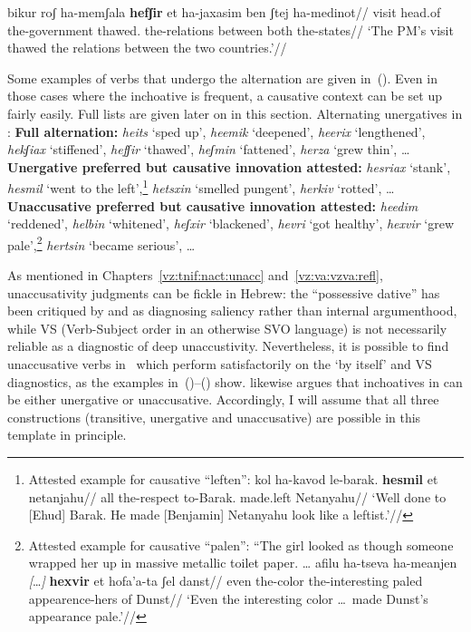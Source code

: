 	\a \begingl
		\gla bikur roʃ ha-memʃala \textbf{hefʃir} et ha-jaxasim ben ʃtej ha-medinot//
		\glb visit head.of the-government thawed.  the-relations between both the-states//
		\glft `The PM's visit thawed the relations between the two countries.'//
		\endgl
\xe

Some examples of verbs that undergo the alternation are given in~(\nextx). Even in those cases where the inchoative is frequent, a causative context can be set up fairly easily. Full lists are given later on in this section.
\pex\label{ex:vd:thif-alt}Alternating unergatives in \thif:
	\a \textbf{Full alternation:} \emph{hei{ts}} `sped up', \emph{heemik} `deepened', \emph{heerix} `lengthened', \emph{hekʃiax} `stiffened', \emph{hefʃir} `thawed', \emph{heʃmin} `fattened', \emph{herza} `grew thin', \dots
	\a \textbf{Unergative preferred but causative innovation attested:} \emph{hesriax} `stank', \emph{hesmil} `went to the left',\footnote{Attested example for causative ``leften'':
	\ex
		\begingl
		\gla kol ha-kavod le-barak. \textbf{hesmil} et netanjahu//
		\glb all the-respect to-Barak. made.left  Netanyahu//
		\glft `Well done to [Ehud] Barak. He made [Benjamin] Netanyahu look like a leftist.'//
		\endgl
	\xe
	} \emph{he{ts}xin} `smelled pungent', \emph{herkiv} `rotted', \dots
	\a \textbf{Unaccusative preferred but causative innovation attested:} \emph{heedim} `reddened', \emph{helbin} `whitened', \emph{heʃxir} `blackened', \emph{hevri} `got healthy',
		\emph{hexvir} `grew pale',\footnote{Attested example for causative ``palen'':
		\ex ``The girl looked as though someone wrapped her up in massive metallic toilet paper. \dots
			\begingl
			\gla afilu ha-tseva ha-meanjen \emph{[}\dots\emph{]} \textbf{hexvir} et hofa'a-ta ʃel danst//
			\glb even the-color the-interesting {} paled  appearence-hers of Dunst//
			\glft `Even the interesting color \dots~made Dunst's appearance pale.'//
			\endgl
		\xe
		} \emph{her{ts}in} `became serious', \dots
\xe

As mentioned in Chapters~\ref{vz:tnif:nact:unacc} and~\ref{vz:va:vzva:refl}, unaccusativity judgments can be fickle in Hebrew: the ``possessive dative'' has been critiqued by \cite{gafter14li} and \cite{linzen14pd} as diagnosing saliency rather than internal argumenthood, while VS (Verb-Subject order in an otherwise SVO language) is not necessarily reliable as a diagnostic of deep unaccustivity. Nevertheless, it is possible to find unaccusative verbs in \thif~which perform satisfactorily on the `by itself' and VS diagnostics, as the examples in~(\nextx)--(\anextx) show. \citet[149]{borer91} likewise argues that inchoatives in {\thif} can be either unergative or unaccusative. Accordingly, I will assume that all three constructions (transitive, unergative and unaccusative) are possible in this template in principle.


